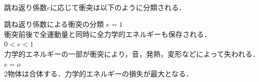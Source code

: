   \ 
%  
%

跳ね返り係数$e$に応じて衝突は以下のように分類される．

 \begin{matome}{跳ね返り係数による衝突の分類}
 \hspace{5mm}  \hspace{2mm}\mbox{\boldmath $e=1$} \hspace {11mm}{\bf 弾性衝突（完全弾性衝突）}\\
 \hspace{10mm} 衝突前後で全運動量と同時に全力学的エネルギーも保存される．\\
 \hspace{5mm}  \hspace{2mm}\mbox{\boldmath $0<e<1$}\hspace {5mm}{\bf 非弾性衝突}\\
 \hspace{10mm} 力学的エネルギーの一部が衝突により，音，発熱，変形などによって失われる．\\
 \hspace{5mm}  \hspace{2mm}\mbox{\boldmath $e=o$}\hspace {13mm}{\bf 完全非弾性衝突}\\
 \hspace{10mm} 2物体は合体する．力学的エネルギーの損失が最大となる．
 \end{matome}



